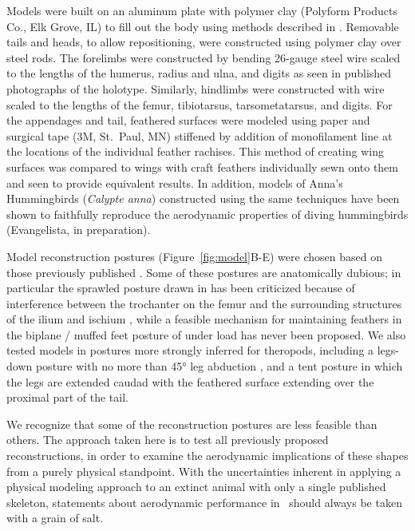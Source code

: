 Models were built on an aluminum plate with polymer clay (Polyform Products Co., Elk Grove, IL) to fill out the body using methods described in \citep{Koehl:2012}.  Removable tails and heads, to allow repositioning, were constructed using polymer clay over steel rods.  The forelimbs were constructed by bending 26-gauge steel wire scaled to the lengths of the humerus, radius and ulna, and digits as seen in published photographs of the holotype.  Similarly, hindlimbs were constructed with wire scaled to the lengths of the femur, tibiotarsus, tarsometatarsus, and digits.  For the appendages and tail, feathered surfaces were modeled using paper and surgical tape (3M, St.\ Paul, MN) stiffened by addition of monofilament line at the locations of the individual feather rachises.  This method of creating wing surfaces was compared to wings with craft feathers individually sewn onto them and seen to provide equivalent results\citep{Koehl:2012}.  In addition, models of Anna's Hummingbirds (\emph{Calypte anna}) constructed using the same techniques have been shown to faithfully reproduce the aerodynamic properties of diving hummingbirds (Evangelista, in preparation).  

Model reconstruction postures (Figure~\ref{fig:model}B-E) were chosen based on those previously published \citep{Xu:2003, Chatterjee:2007, Nova}.  Some of these postures are anatomically dubious; in particular the sprawled posture drawn in \citep{Xu:2003} has been criticized because of interference between the trochanter on the femur and the surrounding structures of the ilium and ischium \citep{someone}, while a feasible mechanism for maintaining feathers in the biplane / muffed feet posture of \citep{Chatterjee:2007} under load has never been proposed.  We also tested models in postures more strongly inferred for theropods, including a legs-down posture with no more than \ang{45} leg abduction \citep{Nova}, and a tent posture in which the legs are extended caudad with the feathered surface extending over the proximal part of the tail.  %

We recognize that some of the reconstruction postures are less feasible than others.  The approach taken here is to test all previously proposed reconstructions, in order to examine the aerodynamic implications of these shapes from a purely physical standpoint.  With the uncertainties inherent in applying a physical modeling approach to an extinct animal with only a single published skeleton, statements about aerodynamic performance in \Mgui\ should always be taken with a grain of salt.  %

